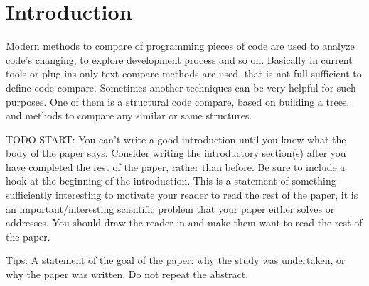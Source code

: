\documentclass{report}
\begin{document}


\newpage
{}
\doublespacing
\large

\chapter{Introduction}

Modern methods to compare of programming pieces of code are used to analyze code's changing, to explore development process and so on. Basically in current tools or plug-ins only text compare methods are used, that is not full sufficient to define code compare.
Sometimes another techniques can be very helpful for such purposes. One of them is a structural code compare, based on building a trees, and methods to compare any similar or same structures. 

TODO START:
You can't write a good introduction until you know what the body of the paper says. Consider writing the introductory section(s) after you have completed the rest of the paper, rather than before.
Be sure to include a hook at the beginning of the introduction. This is a statement of something sufficiently interesting to motivate your reader to read the rest of the paper, it is an important/interesting scientific problem that your paper either solves or addresses. You should draw the reader in and make them want to read the rest of the paper. 

Tips:
A statement of the goal of the paper: why the study was undertaken, or why the paper was written. Do not repeat the abstract. 

 

\newpage	
\end{document}
